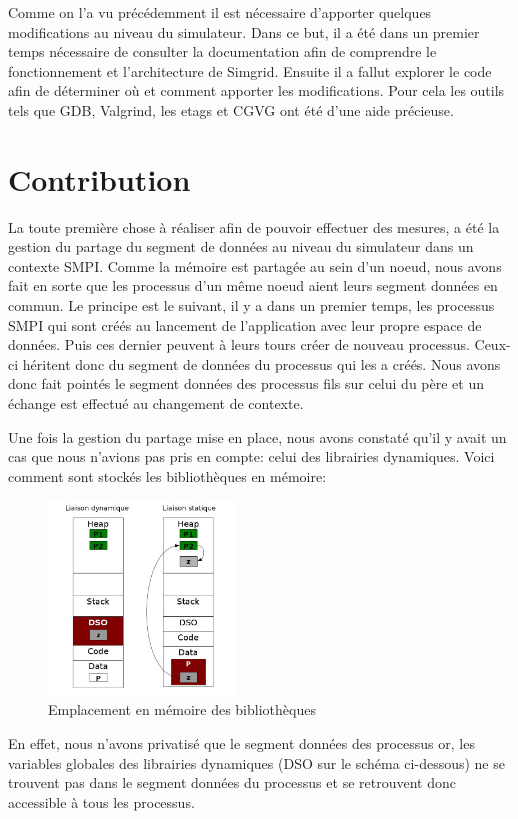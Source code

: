 \documentclass[smallextended]{svjour3}
\begin{document}
Comme on l'a vu précédemment il est nécessaire d'apporter quelques
modifications au niveau du simulateur. Dans ce but, il a été dans un
premier temps nécessaire de consulter la documentation afin de
comprendre le fonctionnement et l'architecture de Simgrid. Ensuite
il a fallut explorer le code afin de déterminer où et comment
apporter les modifications. Pour cela les outils tels que GDB,
Valgrind, les etags et CGVG ont été d'une aide précieuse.

\section{Contribution}
\label{sec-5}
La toute première chose à réaliser afin de pouvoir effectuer des
mesures, a été la gestion du partage du segment de données au niveau
du simulateur dans un contexte SMPI. Comme la mémoire est partagée
au sein d'un noeud, nous avons fait en sorte que les processus d'un
même noeud aient leurs segment données en commun. Le principe est le
suivant, il y a dans un premier temps, les processus SMPI qui sont
créés au lancement de l'application avec leur propre espace de
données. Puis ces dernier peuvent à leurs tours créer de nouveau
processus. Ceux-ci héritent donc du segment de données du processus
qui les a créés. Nous avons donc fait pointés le segment données des
processus fils sur celui du père et un échange est effectué au
changement de contexte.

Une fois la gestion du partage mise en place, nous avons constaté
qu'il y avait un cas que nous n'avions pas pris en compte: celui des
librairies dynamiques. Voici comment sont stockés les bibliothèques
en mémoire:

\begin{figure}[htb]
\centering
\includegraphics[width=5cm]{./Img/StaticDyn.jpg}
\caption{\label{fig:2}Emplacement en mémoire des bibliothèques}
\end{figure}

En effet, nous n'avons privatisé que le segment données des
processus or, les variables globales des librairies dynamiques (DSO
sur le schéma ci-dessous) ne se trouvent pas dans le segment données
du processus et se retrouvent donc accessible à tous les processus. 
\end{document}
